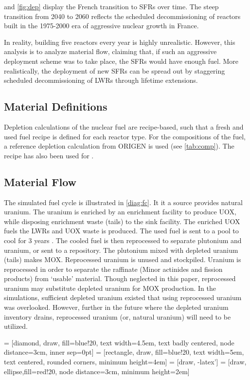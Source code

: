  and \cref{fig:dep} display
the French transition to \glspl{SFR} over time.
The steep transition from 2040 to 2060 reflects the scheduled
decommissioning of reactors built in the 1975-2000
era of aggressive nuclear growth in France.

In reality, building five reactors every year is highly unrealistic. However,
this analysis is to analyze material flow, claiming that, if such an aggressive
deployment scheme was to take place, the \glspl{SFR} would have enough fuel.
More realistically, the deployment of new \glspl{SFR} can be spread out by
staggering scheduled decommissioning of \glspl{LWR} through lifetime extensions.

\subsection{Material Definitions}
Depletion calculations of the nuclear fuel are recipe-based, such that a fresh 
and used fuel recipe is defined for each reactor type.
For the compositions of the fuel, a reference depletion calculation
from ORIGEN is used (see \cref{tab:comp}). The recipe has also been used for
\cite{wilson_adoption_2009}.


\subsection{Material Flow}
The simulated fuel cycle is illustrated in \cref{diag:fc}.
It it a source provides natural uranium. The uranium is enriched by an enrichment
facility to produce \gls{UOX}, while disposing enrichment waste (tails)
to the sink facility. The enriched \gls{UOX} fuels
the \gls{LWR}s and \gls{UOX} waste is produced. The used fuel
is sent to a pool to cool for 3 years \cite{carre_overview_2009}.
The cooled fuel is then reprocessed to separate plutonium and uranium,
or sent to a repository.
The plutonium mixed with depleted uranium (tails) makes \gls{MOX}.
Reprocessed uranium is unused and stockpiled. Uranium is reprocessed
in order to separate the raffinate (Minor actinides and fission products)
from `usable' material. Though neglected in this paper, reprocessed
uranium may substitute depleted uranium for \gls{MOX} production. In the
simulations, sufficient depleted uranium existed that using reprocessed
uranium was overlooked. However, further in the future where the depleted
uranium inventory drains, reprocessed uranium (or, natural uranium) will need to be utilized. 


 = [diamond, draw, fill=blue!20, 
text width=4.5em, text badly centered, node distance=3cm, inner sep=0pt]
 = [rectangle, draw, fill=blue!20, 
text width=5em, text centered, rounded corners, minimum height=4em]
 = [draw, -latex']
 = [draw, ellipse,fill=red!20, node distance=3cm,
minimum height=2em]


